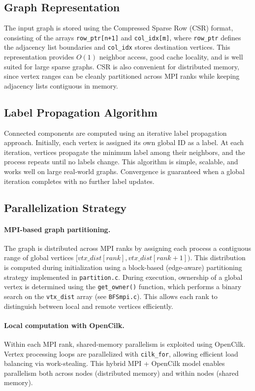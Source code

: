 \documentclass[11pt,a4paper]{article}
\begin{document}
\subsection{Graph Representation}

The input graph is stored using the Compressed Sparse Row (CSR) format, consisting of the arrays \texttt{row\_ptr[n+1]} and \texttt{col\_idx[m]}, where \texttt{row\_ptr} defines the adjacency list boundaries and \texttt{col\_idx} stores destination vertices. This representation provides $O(1)$ neighbor access, good cache locality, and is well suited for large sparse graphs. CSR is also convenient for distributed memory, since vertex ranges can be cleanly partitioned across MPI ranks while keeping adjacency lists contiguous in memory.

\subsection{Label Propagation Algorithm}

Connected components are computed using an iterative label propagation approach. Initially, each vertex is assigned its own global ID as a label. At each iteration, vertices propagate the minimum label among their neighbors, and the process repeats until no labels change. This algorithm is simple, scalable, and works well on large real-world graphs. Convergence is guaranteed when a global iteration completes with no further label updates.

\subsection{Parallelization Strategy}

\paragraph{MPI-based graph partitioning.}
The graph is distributed across MPI ranks by assigning each process a contiguous range of global vertices $[vtx\_dist[rank], vtx\_dist[rank+1])$. This distribution is computed during initialization using a block-based (edge-aware) partitioning strategy implemented in \texttt{partition.c}. During execution, ownership of a global vertex is determined using the \texttt{get\_owner()} function, which performs a binary search on the \texttt{vtx\_dist} array (see \texttt{BFSmpi.c}). This allows each rank to distinguish between local and remote vertices efficiently.

\paragraph{Local computation with OpenCilk.}
Within each MPI rank, shared-memory parallelism is exploited using OpenCilk. Vertex processing loops are parallelized with \texttt{cilk\_for}, allowing efficient load balancing via work-stealing. This hybrid MPI + OpenCilk model enables parallelism both across nodes (distributed memory) and within nodes (shared memory).
\end{document}
